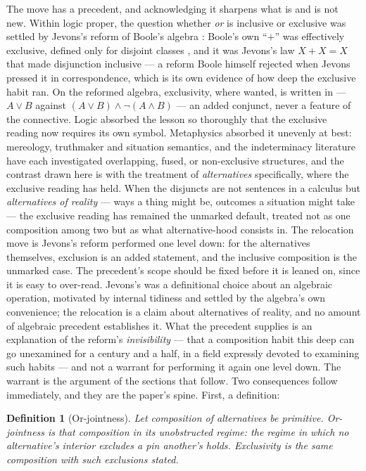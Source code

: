\documentclass[11pt]{article}
\newtheorem{definition}{Definition}
\begin{document}
The move has a precedent, and acknowledging it sharpens what is and is not new. Within logic proper, the question whether \emph{or} is inclusive or exclusive was settled by Jevons's reform of Boole's algebra \parencite{jevons1864}: Boole's own ``$+$'' was effectively exclusive, defined only for disjoint classes \parencite{boole1854}, and it was Jevons's law $X + X = X$ that made disjunction inclusive --- a reform Boole himself rejected when Jevons pressed it in correspondence, which is its own evidence of how deep the exclusive habit ran. On the reformed algebra, exclusivity, where wanted, is written in --- $A \vee B$ against $(A \vee B) \wedge \neg(A \wedge B)$ --- an added conjunct, never a feature of the connective. Logic absorbed the lesson so thoroughly that the exclusive reading now requires its own symbol. Metaphysics absorbed it unevenly at best: mereology, truthmaker and situation semantics, and the indeterminacy literature have each investigated overlapping, fused, or non-exclusive structures, and the contrast drawn here is with the treatment of \emph{alternatives} specifically, where the exclusive reading has held. When the disjuncts are not sentences in a calculus but \emph{alternatives of reality} --- ways a thing might be, outcomes a situation might take --- the exclusive reading has remained the unmarked default, treated not as one composition among two but as what alternative-hood consists in. The relocation move is Jevons's reform performed one level down: for the alternatives themselves, exclusion is an added statement, and the inclusive composition is the unmarked case.
The precedent's scope should be fixed before it is leaned on, since it is easy to over-read. Jevons's was a definitional choice about an algebraic operation, motivated by internal tidiness and settled by the algebra's own convenience; the relocation is a claim about alternatives of reality, and no amount of algebraic precedent establishes it. What the precedent supplies is an explanation of the reform's \emph{invisibility} --- that a composition habit this deep can go unexamined for a century and a half, in a field expressly devoted to examining such habits --- and not a warrant for performing it again one level down. The warrant is the argument of the sections that follow.
Two consequences follow immediately, and they are the paper's spine. First, a definition:
\begin{definition}[Or-jointness]\label{def:jointness}
Let composition of alternatives be primitive. Or-jointness is that composition in its \emph{unobstructed} regime: the regime in which no alternative's interior excludes a pin another's holds. Exclusivity is the same composition with such exclusions stated.
\end{definition}
\end{document}

